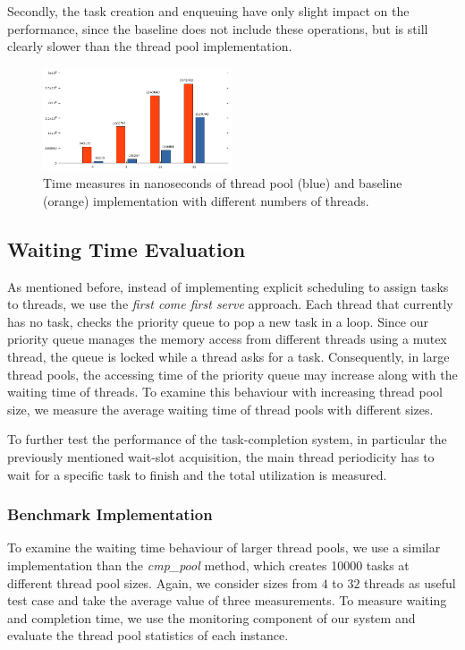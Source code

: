 \documentclass[conference]{IEEEtran}
\begin{document}
Secondly, the task creation and enqueuing have only slight impact on the performance, since the baseline does not include these operations, but is still clearly slower than the thread pool implementation. 

\begin{figure}
	\includegraphics[width=0.5\textwidth]{img/pool_baseline.png}
	\caption{Time measures in nanoseconds of thread pool (blue) and baseline (orange) implementation with different numbers of threads.  }
	\label{fig6}
\end{figure}

\subsection{Waiting Time Evaluation}
As mentioned before, instead of implementing explicit scheduling to assign tasks to threads, we use the \emph{first come first serve} approach. Each thread that currently has no task, checks the priority queue to pop a new task in a loop. Since our priority queue manages the memory access from different threads using a mutex thread, the queue is locked while a thread asks for a task. Consequently, in large thread pools, the accessing time of the priority queue may increase along with the waiting time of threads. To examine this behaviour with increasing thread pool size, we measure the average waiting time of thread pools with different sizes.

To further test the performance of the task-completion system, in particular the previously mentioned wait-slot acquisition, the main thread periodicity has to wait for a specific task to finish and the total utilization is measured.

\subsubsection{Benchmark Implementation}
To examine the waiting time behaviour of larger thread pools, we use a similar implementation than the \emph{cmp\_pool} method, which creates 10000 tasks at different thread pool sizes. Again, we consider sizes from $4$ to $32$ threads as useful test case and take the average value of three measurements. To measure waiting and completion time, we use the monitoring component of our system and evaluate the thread pool statistics of each instance. 
\end{document}
